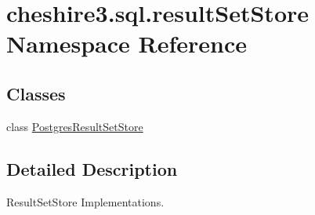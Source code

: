\hypertarget{namespacecheshire3_1_1sql_1_1result_set_store}{\section{cheshire3.\-sql.\-result\-Set\-Store Namespace Reference}
\label{namespacecheshire3_1_1sql_1_1result_set_store}
}
\subsection*{Classes}
\begin{DoxyCompactItemize}
\item 
class \hyperlink{classcheshire3_1_1sql_1_1result_set_store_1_1_postgres_result_set_store}{Postgres\-Result\-Set\-Store}
\end{DoxyCompactItemize}


\subsection{Detailed Description}
\begin{DoxyVerb}ResultSetStore Implementations.\end{DoxyVerb}
 